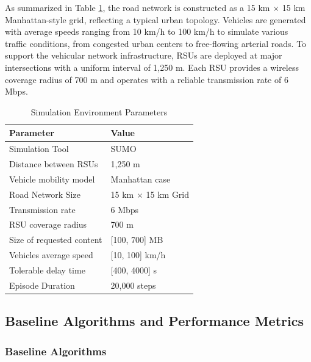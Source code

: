 As summarized in Table \ref{tab:sim_params}, the road network is constructed as a 15 km $\times$ 15 km Manhattan-style grid, reflecting a typical urban topology. Vehicles are generated with average speeds ranging from 10 km/h to 100 km/h to simulate various traffic conditions, from congested urban centers to free-flowing arterial roads. To support the vehicular network infrastructure, RSUs are deployed at major intersections with a uniform interval of 1,250 m. Each RSU provides a wireless coverage radius of 700 m and operates with a reliable transmission rate of 6 Mbps.

\begin{table}[h!]
\centering
\caption{Simulation Environment Parameters}
\label{tab:sim_params}
\begin{tabular}{ll}
\hline
\textbf{Parameter} & \textbf{Value} \\ \hline
Simulation Tool & SUMO \\
Distance between RSUs & 1,250 m \\
Vehicle mobility model & Manhattan case \\
Road Network Size & 15 km $\times$ 15 km Grid \\
Transmission rate & 6 Mbps \\
RSU coverage radius & 700 m \\
Size of requested content & [100, 700] MB \\
Vehicles average speed & [10, 100] km/h \\
Tolerable delay time & [400, 4000] s \\
Episode Duration & 20,000 steps \\ \hline
\end{tabular}
\end{table}

\subsection{Baseline Algorithms and Performance Metrics}
\subsubsection{Baseline Algorithms}

